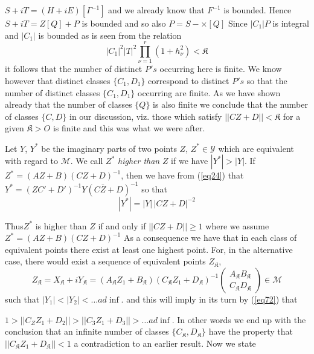 $S+ i T=(H +  i E) [\Gamma^{-1}]$ and we already know that $F^{-1}$ is
bounded. Hence $S+iT=Z[Q]+P$ is bounded and so also $P=S-\times[Q]$ Since
$|C_1|P$ is integral and $|C_1|$ is bounded as is seen from
the relation 
$$
|C_1|^2 |T|^2 \prod^r_{\nu=1}(1+h^2_\nu) < \mathfrak{K}
$$
it follows that the number of distinct $P's$ occurring here is
finite. We know however that distinct classes $\{C_1,D_1\}$ correspond
to distinct $P's$ so that the number of distinct classes $\{C_1,D_1\}$
occurring are finite. As we have shown already that the number of
classes $\{Q\}$ is also finite we conclude that the number of classes
$\{C,D\}$ in our discussion, viz. those which satisfy $|| CZ + D || <
\mathfrak{K}$ for a given $\mathfrak{K} > O$ is finite and this was what
we were after. 

Let $Y$, $Y^*$ be the imaginary parts of two points $Z$, $Z^* \in 
\mathscr{Y}$ which are equivalent with regard to $\mathcal{M}$. We
call $Z^*$ \textit{higher than} $Z$ if we have $|Y^*| > |Y|$. If
$Z^*=(AZ+B)(CZ+D)^{-1}$, then we have from (\ref{eq24}) that
$Y^*=(ZC'+D')^{-1}Y(C\bar{Z}+D)^{-1}$ so that  
\begin{equation*}
|Y^*|=|Y| \, \big|CZ+D \big|^{-2} \tag{72}\label{eq72}  
\end{equation*}


Thus\pageoriginale $Z^*$ is higher than $Z$ if and only if $||CZ + D||
\geq 1$ where 
we assume $Z^* = (AZ + B)(CZ + D)^{-1}$ As a consequence we have that
in each class of equivalent points there exist at least one highest
point. For, in the alternative case, there would exist a sequence of
equivalent points $Z_{\mathfrak{K}}$, 
$$
Z_\mathfrak{K} = X_\mathfrak{K} + i Y_\mathfrak{K}=(A_\mathfrak{K} Z_1 +
B_\mathfrak{K}) (C_\mathfrak{K} Z_1 + D_\mathfrak{K})^{-1} 
\begin{pmatrix}
  A_\mathfrak{K} B_\mathfrak{K} \\ 
C_\mathfrak{K} D_\mathfrak{K} \end{pmatrix} 
\in \mathcal{M}
$$
 such that $|Y_1 | <
|Y_2 | < \ldots ad \inf$. and this will imply in its turn by (\ref{eq72})
that 

$1 > || C_Z Z_1 +D_2 || > ||C_3 Z_1 +D_3 ||> \ldots ad \inf$. In other
words we end up with the conclusion that an infinite number of classes
$\{C_\mathfrak{K}, D_\mathfrak{K}\}$ have the property that $||
C_\mathfrak{K} Z_1 +D_\mathfrak{K} || < 1$ a contradiction to an earlier 
result. Now we state 


